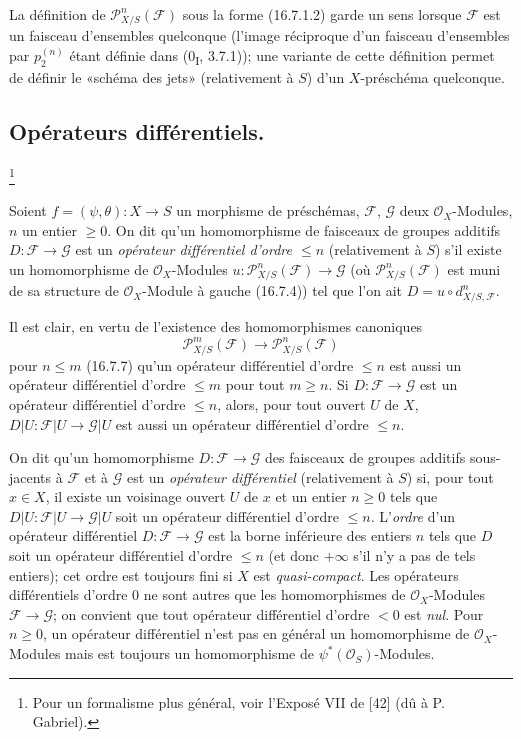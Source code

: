\begin{remark}[16.7.10]
\label{IV.16.7.10}
La définition de $\mathscr{P}_{X/S}^n(\mathscr{F})$ sous la forme (16.7.1.2)
garde un sens lorsque $\mathscr{F}$ est un faisceau d'ensembles quelconque
(l'image réciproque d'un faisceau d'ensembles par $p_2^{(n)}$ étant définie
dans (0\textsubscript{I}, 3.7.1)); une variante de cette définition permet de
définir le «schéma des jets» (relativement à $S$) d'un $X$-préschéma
quelconque.
\end{remark}

\subsection{Opérateurs différentiels.}
\footnote{Pour un formalisme plus général, voir l'Exposé VII de [42]
(dû à P. Gabriel).}
\label{IV.16.8}

\begin{definition}[16.8.1]
\label{IV.16.8.1}
Soient $f=(\psi,\theta):X\to S$ un morphisme de préschémas,
$\mathscr{F}$, $\mathscr{G}$ deux $\mathcal{O}_X$-Modules, $n$ un entier
$\geq0$. On dit qu'un homomorphisme de faisceaux de groupes additifs
$D:\mathscr{F}\to\mathscr{G}$ est un \emph{opérateur différentiel d'ordre
$\leq n$} (relativement à $S$) s'il existe un homomorphisme de
$\mathcal{O}_X$-Modules
$u:\mathscr{P}_{X/S}^n(\mathscr{F})\to\mathscr{G}$ (où
$\mathscr{P}_{X/S}^n(\mathscr{F})$ est muni de sa structure de
$\mathcal{O}_X$-Module à gauche (16.7.4)) tel que l'on ait
$D=u\circ d_{X/S,\mathscr{F}}^n$.
\end{definition}

Il est clair, en vertu de l'existence des homomorphismes canoniques
\[
  \mathscr{P}_{X/S}^m(\mathscr{F})
  \longrightarrow\mathscr{P}_{X/S}^n(\mathscr{F})
\]
pour $n\leq m$ (16.7.7) qu'un opérateur différentiel d'ordre $\leq n$ est
aussi un opérateur différentiel d'ordre $\leq m$ pour tout $m\geq n$. Si
$D:\mathscr{F}\to\mathscr{G}$ est un opérateur différentiel d'ordre
$\leq n$, alors, pour tout ouvert $U$ de $X$,
$D|U:\mathscr{F}|U\to\mathscr{G}|U$ est aussi un opérateur différentiel
d'ordre $\leq n$.

On dit qu'un homomorphisme $D:\mathscr{F}\to\mathscr{G}$ des faisceaux de
groupes additifs sous-jacents à $\mathscr{F}$ et à $\mathscr{G}$ est un
\emph{opérateur différentiel} (relativement à $S$) si, pour tout $x\in X$, il
existe un voisinage ouvert $U$ de $x$ et un entier $n\geq0$ tels que
$D|U:\mathscr{F}|U\to\mathscr{G}|U$ soit un opérateur différentiel d'ordre
$\leq n$. L'\emph{ordre} d'un opérateur différentiel
$D:\mathscr{F}\to\mathscr{G}$ est la borne inférieure des entiers $n$ tels
que $D$ soit un opérateur différentiel d'ordre $\leq n$ (et donc $+\infty$
s'il n'y a pas de tels entiers); cet ordre est toujours fini si $X$ est
\emph{quasi-compact}. Les opérateurs différentiels d'ordre $0$ ne sont autres
que les homomorphismes de $\mathcal{O}_X$-Modules
$\mathscr{F}\to\mathscr{G}$; on convient que tout opérateur différentiel
d'ordre $<0$ est \emph{nul}. Pour $n\geq0$, un opérateur différentiel n'est
pas en général un homomorphisme de $\mathcal{O}_X$-Modules mais est toujours
un homomorphisme de $\psi^*(\mathcal{O}_S)$-Modules.

